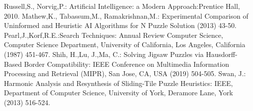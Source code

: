 \documentclass{svproc}
\begin{document}
\begin{thebibliography}{6}
%

Russell,S., Norvig,P.: Artificial Intelligence: a Modern Approach:Prentice Hall, 2010.
Mathew,K., Tabassum,M., Ramakrishnan,M.: Experimental Comparison of Uninformed and Heuristic AI Algorithms for N Puzzle Solution (2013) 43-50. 
Pearl,J.,Korf,R.E.:Search Techniques: Annual Review Computer Science, Computer Science Department, University of California, Los Angeles, California  (1987) 451-467. 
Shih, H.,Lu, J.,Ma, C.: Solving Jigsaw Puzzles via Hausdorff-Based Border Compatibility: IEEE Conference on Multimedia Information Processing and Retrieval (MIPR), San Jose, CA, USA (2019) 504-505.
Swan, J.: Harmonic Analysis and Resynthesis of Sliding-Tile Puzzle Heuristics: IEEE, Department of Computer Science, University of York, Deramore Lane, York (2013) 516-524.

\end{thebibliography}
\end{document}
